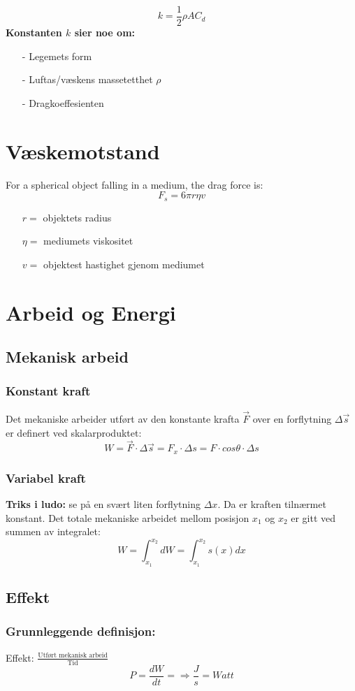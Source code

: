 \documentclass[12pt]{article}
\begin{document}
\bigskip
$$k = \frac{1}{2}\rho AC_d$$
\textbf{Konstanten $k$ sier noe om:}
\begin{itemize}
    \item[-] Legemets form
    \item[-] Luftas/væskens massetetthet $\rho$
    \item[-] Dragkoeffesienten %
\end{itemize}

\section{Væskemotstand}
For a spherical object falling in a medium, the drag force is:
$$F_s = 6\pi r\eta v$$
\begin{itemize}
    \item[] $r =$ objektets radius
    \item[] $\eta =$ mediumets viskositet
    \item[] $v =$ objektest hastighet gjenom mediumet
\end{itemize}

\section{Arbeid og Energi}
\subsection{Mekanisk arbeid}
\subsubsection{Konstant kraft}
Det mekaniske arbeider utført av den konstante krafta $\Vec{F}$ over en forflytning $\Delta\Vec{s}$ er definert ved skalarproduktet:
$$W = \Vec{F} \cdot \Delta\Vec{s} = F_x \cdot \Delta s = F \cdot cos\theta \cdot\Delta s$$
%
\subsubsection{Variabel kraft}
\textbf{Triks i ludo:} se på en svært liten forflytning $\Delta x$. Da er kraften tilnærmet konstant.
Det totale mekaniske arbeidet mellom posisjon $x_1$ og $x_2$ er gitt ved summen av integralet:
$$W = \int_{x_1}^{x_2} dW = \int_{x_1}^{x_2} s(x) dx $$
%
\subsection{Effekt}
\subsubsection{Grunnleggende definisjon:} 
Effekt: $\frac{\text{Utført mekanisk arbeid}}{\text{Tid}}$
$$P = \frac{dW}{dt} = \Rightarrow \frac{J}{s} = Watt$$
\end{document}
